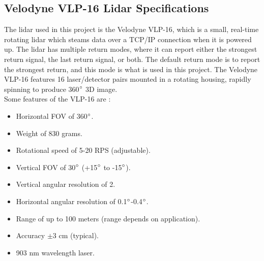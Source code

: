 \subsection{Velodyne VLP-16 Lidar Specifications}
The lidar used in this project is the Velodyne VLP-16, which is a small, real-time rotating lidar which steams data over a TCP/IP connection when it is powered up. The lidar has multiple return modes, where it can report either the strongest return signal, the last return signal, or both. The default return mode is to report the strongest return, and this mode is what is used in this project. The Velodyne VLP-16 features 16 laser/detector pairs mounted in a rotating housing, rapidly spinning to produce 360$\degree$ 3D image.\smallskip \\
Some features of the VLP-16 are \cite{velodyne_vlp16}:
\begin{itemize}
	\item Horizontal FOV of 360$\degree$.
	\item Weight of 830 grams.
	\item Rotational speed of 5-20 RPS (adjustable).
	\item Vertical FOV of 30$\degree$ (+15$\degree$ to -15$\degree$).
	\item Vertical angular resolution of 2\degree.
	\item Horizontal angular resolution of 0.1$\degree$-0.4$\degree$.
	\item Range of up to 100 meters (range depends on application).
	\item Accuracy $\pm3$ cm (typical).
	\item 903 nm wavelength laser.
\end{itemize}

